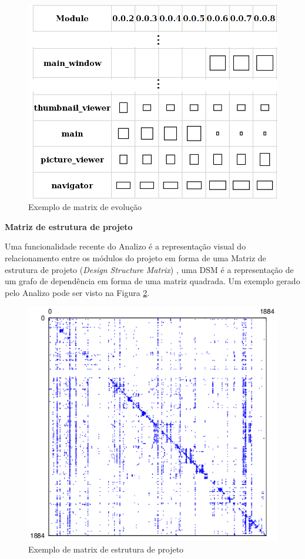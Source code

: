 \begin{figure}[h]
\center
\includegraphics[scale=0.2]{imagens/sample-evolution-matrix.png}
\caption{Exemplo de matrix de evolução}
\label{sample-evolution-matrix}
\end{figure}

{\bf Matriz de estrutura de projeto}

Uma funcionalidade recente do Analizo é a representação visual do
relacionamento entre os módulos do projeto em forma de uma Matriz de estrutura
de projeto ({\it Design Structure Matrix}) \cite{Maccormack2006}, uma DSM é a
representação de um grafo de dependência em forma de uma matriz quadrada. Um
exemplo gerado pelo Analizo pode ser visto na Figura \ref{sample-dsm}.

\begin{figure}[h]
\center
\includegraphics[scale=0.3]{imagens/sample-dsm.png}
\caption{Exemplo de matrix de estrutura de projeto}
\label{sample-dsm}
\end{figure}

